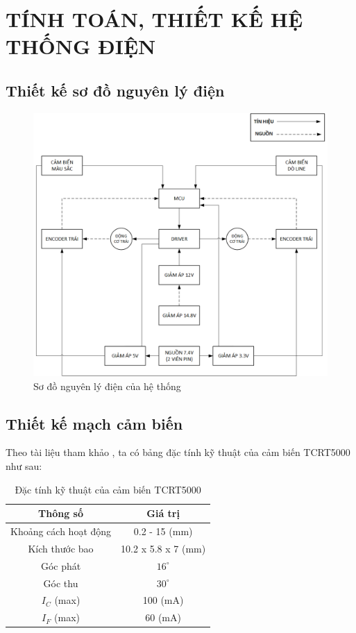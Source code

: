 \chapter{TÍNH TOÁN, THIẾT KẾ HỆ THỐNG ĐIỆN}
    \section{Thiết kế sơ đồ nguyên lý điện}
        \begin{figure}[H]
            \centering
            \includegraphics[width=1\textwidth]{pictures/chapter4/c4_p1_ElectricalFlow.png}
            \caption{Sơ đồ nguyên lý điện của hệ thống}
            \label{fig:4-1}
        \end{figure}
    \section{Thiết kế mạch cảm biến}
        \hspace*{0.6cm}Theo tài liệu tham khảo \cite{vishay_tcrt5000_1}, ta có bảng đặc tính kỹ thuật của cảm biến TCRT5000 như sau:
        \begin{table}[H]
            \centering
            \caption{Đặc tính kỹ thuật của cảm biến TCRT5000}
            \label{tab:4-1}
            \begin{tabular}{|c|c|}
                \hline
                \textbf{Thông số} & \textbf{Giá trị} \\
                \hline
                Khoảng cách hoạt động & 0.2 - 15 (mm) \\
                \hline
                Kích thước bao & 10.2 x 5.8 x 7 (mm) \\
                \hline
                Góc phát & $16^{\circ}$ \\
                \hline
                Góc thu & $30^{\circ}$ \\
                \hline
                $I_{C}$ (max) & 100 (mA) \\
                \hline
                $I_{F}$ (max) & 60 (mA) \\
                \hline
            \end{tabular}
        \end{table}
